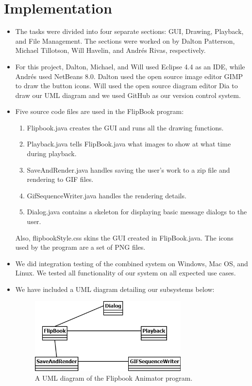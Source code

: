 \documentclass[10 pt]{scrartcl}
\begin{document}
\section{Implementation}

\begin{itemize}
    \item The tasks were divided into four separate sections: GUI, Drawing, Playback, and File Management. The sections were worked on by Dalton Patterson, Michael Tillotson, Will Havelin, and Andr\'{e}s Rivas, respectively.
    \item For this project, Dalton, Michael, and Will used Eclipse 4.4 as an IDE, while Andr\'{e}s used NetBeans 8.0. Dalton used the open source image editor GIMP to draw the button icons. Will used the open source diagram editor Dia to draw our UML diagram and we used GitHub as our version control system.
    \item Five source code files are used in the FlipBook program:
    \begin{enumerate}
        \item Flipbook.java creates the GUI and runs all the drawing functions.
        \item Playback.java tells FlipBook.java what images to show at what time during playback.
        \item SaveAndRender.java handles saving the user's work to a zip file and rendering to GIF files. 
        \item GifSequenceWriter.java handles the rendering details.
        \item Dialog.java contains a skeleton for displaying basic message dialogs to the user.
    \end{enumerate}
    Also, flipbookStyle.css skins the GUI created in FlipBook.java.  The icons used by the program are a set of PNG files.
    \item We did integration testing of the combined system on Windows, Mac OS, and Linux. We tested all functionality of our system on all expected use cases.
    \item We have included a UML diagram detailing our subsystems below:
    \begin{figure}[H]
        \centering
        \includegraphics[width=0.75\textwidth]{flipbookUML}
        \caption{A UML diagram of the Flipbook Animator program.}
    \end{figure}
\end{itemize}
\end{document}
